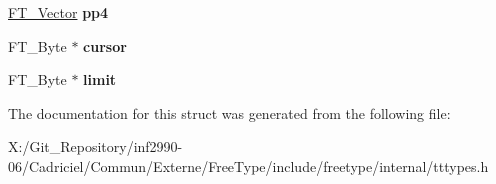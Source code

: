 \begin{DoxyCompactItemize}
\item 
\hypertarget{struct_t_t___loader_rec___a0608203207c3fc735046b8baef4b9201}{\hyperlink{struct_f_t___vector__}{F\-T\-\_\-\-Vector} {\bfseries pp4}}\label{struct_t_t___loader_rec___a0608203207c3fc735046b8baef4b9201}

\item 
\hypertarget{struct_t_t___loader_rec___a6769a96f37ca22801f6199937cbe9ca7}{F\-T\-\_\-\-Byte $\ast$ {\bfseries cursor}}\label{struct_t_t___loader_rec___a6769a96f37ca22801f6199937cbe9ca7}

\item 
\hypertarget{struct_t_t___loader_rec___a1b07761e8ea436c38b4c42117a00a0ff}{F\-T\-\_\-\-Byte $\ast$ {\bfseries limit}}\label{struct_t_t___loader_rec___a1b07761e8ea436c38b4c42117a00a0ff}

\end{DoxyCompactItemize}


The documentation for this struct was generated from the following file\-:\begin{DoxyCompactItemize}
\item 
X\-:/\-Git\-\_\-\-Repository/inf2990-\/06/\-Cadriciel/\-Commun/\-Externe/\-Free\-Type/include/freetype/internal/tttypes.\-h\end{DoxyCompactItemize}
